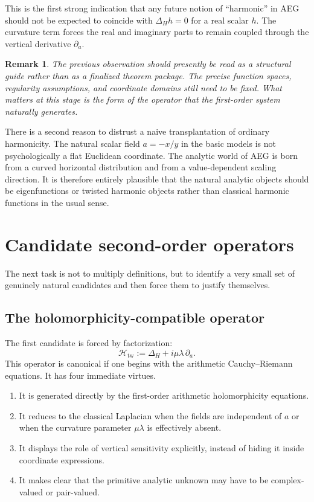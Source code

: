 \documentclass[11pt]{article}
\newtheorem{remark}{Remark}[section]
\newcommand{\AEG}{AEG}
\begin{document}
This is the first strong indication that any future notion of ``harmonic'' in \AEG{} should not be expected to coincide with $\Delta_H h=0$ for a real scalar $h$. The curvature term forces the real and imaginary parts to remain coupled through the vertical derivative $\partial_a$.

\begin{remark}
The previous observation should presently be read as a structural guide rather than as a finalized theorem package. The precise function spaces, regularity assumptions, and coordinate domains still need to be fixed. What matters at this stage is the form of the operator that the first-order system naturally generates.
\end{remark}

There is a second reason to distrust a naive transplantation of ordinary harmonicity. The natural scalar field $a=-x/y$ in the basic models is not psychologically a flat Euclidean coordinate. The analytic world of \AEG{} is born from a curved horizontal distribution and from a value-dependent scaling direction. It is therefore entirely plausible that the natural analytic objects should be eigenfunctions or twisted harmonic objects rather than classical harmonic functions in the usual sense.

\section{Candidate second-order operators}

The next task is not to multiply definitions, but to identify a very small set of genuinely natural candidates and then force them to justify themselves.

\subsection{The holomorphicity-compatible operator}

The first candidate is forced by factorization:
\begin{equation}
\mathcal{H}_{\mathrm{tw}} := \Delta_H + i\mu\lambda\,\partial_a.
\end{equation}
This operator is canonical if one begins with the arithmetic Cauchy--Riemann equations. It has four immediate virtues.
\begin{enumerate}[label=(\alph*)]
\item It is generated directly by the first-order arithmetic holomorphicity equations.
\item It reduces to the classical Laplacian when the fields are independent of $a$ or when the curvature parameter $\mu\lambda$ is effectively absent.
\item It displays the role of vertical sensitivity explicitly, instead of hiding it inside coordinate expressions.
\item It makes clear that the primitive analytic unknown may have to be complex-valued or pair-valued.
\end{enumerate}
\end{document}
